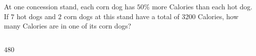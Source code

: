  
At one concession stand, each corn dog has $50\%$ more Calories than each hot dog.  If $7$ hot dogs and $2$ corn dogs at this stand have a total of $3200$ Calories, how many Calories are in one of its corn dogs?\\ \\


\ifsat
	\begin{enumerate}[label=\Alph*)]
	\end{enumerate}
\else
\fi

\ifacteven
	\begin{enumerate}[label=\textbf{\Alph*.},itemsep=\fill,align=left]
	\end{enumerate}
\else
\fi

\ifactodd
	\begin{enumerate}[label=\textbf{\Alph*.},itemsep=\fill,align=left]
	\end{enumerate}
\else
\fi

\ifgridin
$480$
\else
\fi

